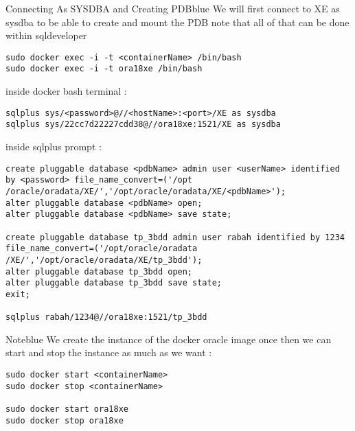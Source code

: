\documentclass{article}
\begin{document}
\vspace{1cm}
\begin{prettyBox}{Connecting As SYSDBA and Creating PDB}{blue}
We will first connect to XE as sysdba to be able to create and mount the PDB note that all of that can be done
within sqldeveloper

\vspace{0.15cm}
\begin{verbatim}
sudo docker exec -i -t <containerName> /bin/bash
sudo docker exec -i -t ora18xe /bin/bash
\end{verbatim}
inside docker bash terminal :
\begin{verbatim}
sqlplus sys/<password>@//<hostName>:<port>/XE as sysdba
sqlplus sys/22cc7d22227cdd38@//ora18xe:1521/XE as sysdba
\end{verbatim}
inside sqlplus prompt :
\begin{verbatim}
create pluggable database <pdbName> admin user <userName> identified by <password> file_name_convert=('/opt
/oracle/oradata/XE/','/opt/oracle/oradata/XE/<pdbName>');
alter pluggable database <pdbName> open;
alter pluggable database <pdbName> save state;

create pluggable database tp_3bdd admin user rabah identified by 1234 file_name_convert=('/opt/oracle/oradata
/XE/','/opt/oracle/oradata/XE/tp_3bdd');
alter pluggable database tp_3bdd open;
alter pluggable database tp_3bdd save state;
exit;

sqlplus rabah/1234@//ora18xe:1521/tp_3bdd

\end{verbatim}
\end{prettyBox}

\vspace{0.5cm}
\begin{prettyBox}{Note}{blue}
We create the instance of the docker oracle image once then we can start and stop the instance as much as we want :
\begin{verbatim}
sudo docker start <containerName>
sudo docker stop <containerName>

sudo docker start ora18xe
sudo docker stop ora18xe
\end{verbatim}
\end{prettyBox}
\end{document}

